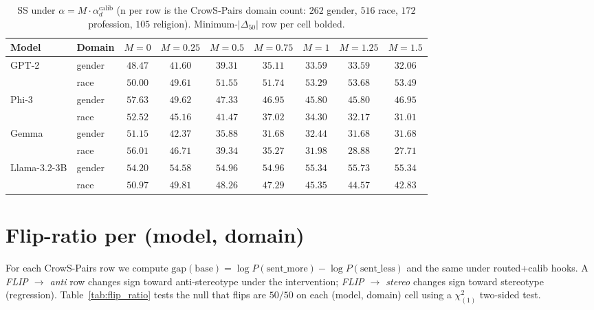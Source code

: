 \begin{table}[h]
\centering
\small
\caption{SS under $\alpha = M \cdot \alpha_d^{\text{calib}}$ (n per
row is the CrowS-Pairs domain count: $262$ gender, $516$ race, $172$
profession, $105$ religion). Minimum-$|\Delta_{50}|$ row per cell
bolded.}
\label{tab:iso_ss50}
\begin{tabular}{llccccccc}
\toprule
Model & Domain & $M{=}0$ & $M{=}0.25$ & $M{=}0.5$ & $M{=}0.75$ & $M{=}1$ & $M{=}1.25$ & $M{=}1.5$ \\
\midrule
\multirow{2}{*}{GPT-2}
& gender & $\mathbf{48.47}$ & $41.60$ & $39.31$ & $35.11$ & $33.59$ & $33.59$ & $32.06$ \\
& race   & $\mathbf{50.00}$ & $49.61$ & $51.55$ & $51.74$ & $53.29$ & $53.68$ & $53.49$ \\
\midrule
\multirow{2}{*}{Phi-3}
& gender & $57.63$ & $\mathbf{49.62}$ & $47.33$ & $46.95$ & $45.80$ & $45.80$ & $46.95$ \\
& race   & $\mathbf{52.52}$ & $45.16$ & $41.47$ & $37.02$ & $34.30$ & $32.17$ & $31.01$ \\
\midrule
\multirow{2}{*}{Gemma}
& gender & $\mathbf{51.15}$ & $42.37$ & $35.88$ & $31.68$ & $32.44$ & $31.68$ & $31.68$ \\
& race   & $56.01$ & $\mathbf{46.71}$ & $39.34$ & $35.27$ & $31.98$ & $28.88$ & $27.71$ \\
\midrule
\multirow{2}{*}{Llama-3.2-3B}
& gender & $\mathbf{54.20}$ & $54.58$ & $54.96$ & $54.96$ & $55.34$ & $55.73$ & $55.34$ \\
& race   & $50.97$ & $\mathbf{49.81}$ & $48.26$ & $47.29$ & $45.35$ & $44.57$ & $42.83$ \\
\bottomrule
\end{tabular}
\end{table}

\section{Flip-ratio per (model, domain)}
\label{app:flip_ratio}

For each CrowS-Pairs row we compute
$\mathrm{gap}(\text{base}) = \log P(\text{sent\_more}) -
 \log P(\text{sent\_less})$ and the same under routed+calib hooks.
A \emph{FLIP $\to$ anti} row changes sign toward anti-stereotype under
the intervention; \emph{FLIP $\to$ stereo} changes sign toward
stereotype (regression). Table~\ref{tab:flip_ratio} tests the null
that flips are $50/50$ on each (model, domain) cell using a
$\chi^2_{(1)}$ two-sided test.

